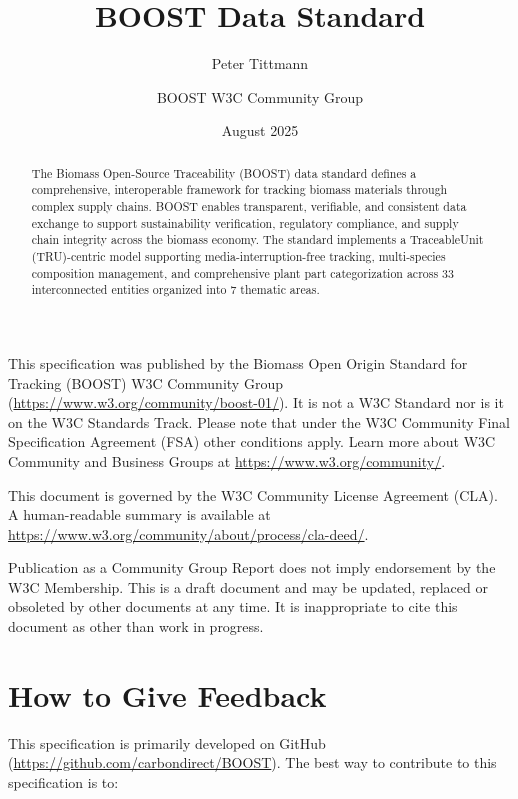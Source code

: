 \documentclass[12pt,a4paper]{article}
\title{BOOST Data Standard}
\author{Peter Tittmann \and BOOST W3C Community Group}
\date{August 2025}
\begin{document}

\boosttitle


\newpage
{}

\begin{abstract}
The Biomass Open-Source Traceability (BOOST) data standard defines a comprehensive, interoperable framework for tracking biomass materials through complex supply chains. BOOST enables transparent, verifiable, and consistent data exchange to support sustainability verification, regulatory compliance, and supply chain integrity across the biomass economy. The standard implements a TraceableUnit (TRU)-centric model supporting media-interruption-free tracking, multi-species composition management, and comprehensive plant part categorization across 33 interconnected entities organized into 7 thematic areas.
\end{abstract}

\begin{w3cstatus}
This specification was published by the Biomass Open Origin Standard for Tracking (BOOST) W3C Community Group (\url{https://www.w3.org/community/boost-01/}). It is not a W3C Standard nor is it on the W3C Standards Track. Please note that under the W3C Community Final Specification Agreement (FSA) other conditions apply. Learn more about W3C Community and Business Groups at \url{https://www.w3.org/community/}.

This document is governed by the W3C Community License Agreement (CLA). A human-readable summary is available at \url{https://www.w3.org/community/about/process/cla-deed/}.

Publication as a Community Group Report does not imply endorsement by the W3C Membership. This is a draft document and may be updated, replaced or obsoleted by other documents at any time. It is inappropriate to cite this document as other than work in progress.
\end{w3cstatus}

\section*{How to Give Feedback}
This specification is primarily developed on GitHub (\url{https://github.com/carbondirect/BOOST}). The best way to contribute to this specification is to:
\end{document}
